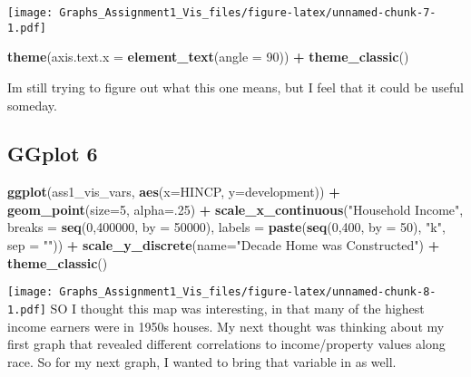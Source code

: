 \documentclass[
]{article}
\newenvironment{Shaded}{\begin{snugshade}}{\end{snugshade}}
\newcommand{\DataTypeTok}[1]{\textcolor[rgb]{0.13,0.29,0.53}{#1}}
\newcommand{\DecValTok}[1]{\textcolor[rgb]{0.00,0.00,0.81}{#1}}
\newcommand{\KeywordTok}[1]{\textcolor[rgb]{0.13,0.29,0.53}{\textbf{#1}}}
\newcommand{\NormalTok}[1]{#1}
\newcommand{\OperatorTok}[1]{\textcolor[rgb]{0.81,0.36,0.00}{\textbf{#1}}}
\newcommand{\StringTok}[1]{\textcolor[rgb]{0.31,0.60,0.02}{#1}}
\begin{document}
\texttt{[image: Graphs\_Assignment1\_Vis\_files/figure-latex/unnamed-chunk-7-1.pdf]}

\begin{Shaded}
\begin{Highlighting}[]
  \KeywordTok{theme}\NormalTok{(}\DataTypeTok{axis.text.x =} \KeywordTok{element_text}\NormalTok{(}\DataTypeTok{angle =} \DecValTok{90}\NormalTok{)) }\OperatorTok{+}
\StringTok{  }\KeywordTok{theme_classic}\NormalTok{()}
\end{Highlighting}
\end{Shaded}

Im still trying to figure out what this one means, but I feel that it
could be useful someday.

\hypertarget{ggplot-6}{%
\subsection{GGplot 6}\label{ggplot-6}}

\begin{Shaded}
\begin{Highlighting}[]
\KeywordTok{ggplot}\NormalTok{(ass1_vis_vars, }\KeywordTok{aes}\NormalTok{(}\DataTypeTok{x=}\NormalTok{HINCP, }\DataTypeTok{y=}\NormalTok{development)) }\OperatorTok{+}
\StringTok{  }\KeywordTok{geom_point}\NormalTok{(}\DataTypeTok{size=}\DecValTok{5}\NormalTok{, }\DataTypeTok{alpha=}\NormalTok{.}\DecValTok{25}\NormalTok{) }\OperatorTok{+}
\StringTok{  }\KeywordTok{scale_x_continuous}\NormalTok{(}\StringTok{"Household Income"}\NormalTok{,}
                      \DataTypeTok{breaks =} \KeywordTok{seq}\NormalTok{(}\DecValTok{0}\NormalTok{,}\DecValTok{400000}\NormalTok{, }\DataTypeTok{by =} \DecValTok{50000}\NormalTok{),}
                     \DataTypeTok{labels =} \KeywordTok{paste}\NormalTok{(}\KeywordTok{seq}\NormalTok{(}\DecValTok{0}\NormalTok{,}\DecValTok{400}\NormalTok{, }\DataTypeTok{by =} \DecValTok{50}\NormalTok{),}
                     \StringTok{"k"}\NormalTok{, }\DataTypeTok{sep =} \StringTok{""}\NormalTok{)) }\OperatorTok{+}\StringTok{ }
\StringTok{  }\KeywordTok{scale_y_discrete}\NormalTok{(}\DataTypeTok{name=}\StringTok{"Decade Home was Constructed"}\NormalTok{) }\OperatorTok{+}\StringTok{ }
\StringTok{  }\KeywordTok{theme_classic}\NormalTok{()}
\end{Highlighting}
\end{Shaded}

\texttt{[image: Graphs\_Assignment1\_Vis\_files/figure-latex/unnamed-chunk-8-1.pdf]}
SO I thought this map was interesting, in that many of the highest
income earners were in 1950s houses. My next thought was thinking about
my first graph that revealed different correlations to income/property
values along race. So for my next graph, I wanted to bring that variable
in as well.
\end{document}
